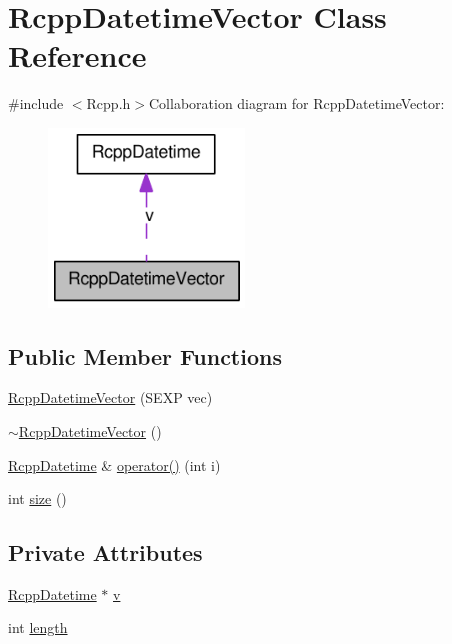 \hypertarget{classRcppDatetimeVector}{
\section{RcppDatetimeVector Class Reference}
\label{classRcppDatetimeVector}
}


{\ttfamily \#include $<$Rcpp.h$>$}Collaboration diagram for RcppDatetimeVector:\nopagebreak
\begin{figure}[H]
\begin{center}
\leavevmode
\includegraphics[width=148pt]{classRcppDatetimeVector__coll__graph}
\end{center}
\end{figure}
\subsection*{Public Member Functions}
\begin{DoxyCompactItemize}
\item 
\hyperlink{classRcppDatetimeVector_a1c1d1e2087fdc8e7601299dc2c4fe24c}{RcppDatetimeVector} (SEXP vec)
\item 
\hyperlink{classRcppDatetimeVector_a81d6c5daba7448058a2f896841ddeb3a}{$\sim$RcppDatetimeVector} ()
\item 
\hyperlink{classRcppDatetime}{RcppDatetime} \& \hyperlink{classRcppDatetimeVector_a2ffa33b5231a7975652e1e2498d0e16a}{operator()} (int i)
\item 
int \hyperlink{classRcppDatetimeVector_a8ca7268098fb2b9250523c4e2ef3c8b7}{size} ()
\end{DoxyCompactItemize}
\subsection*{Private Attributes}
\begin{DoxyCompactItemize}
\item 
\hyperlink{classRcppDatetime}{RcppDatetime} $\ast$ \hyperlink{classRcppDatetimeVector_a0138476000351892e9ec591b2c9ec02f}{v}
\item 
int \hyperlink{classRcppDatetimeVector_ae131031fcf2e65b7bfeee3d8e25c4f8c}{length}
\end{DoxyCompactItemize}


